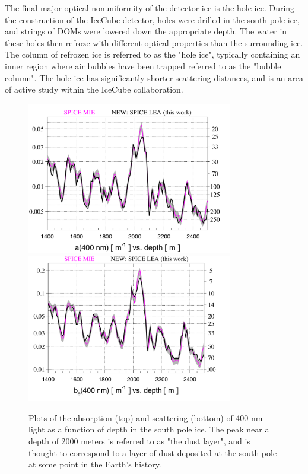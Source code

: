 The final major optical nonuniformity of the detector ice is the hole ice. During the construction of the IceCube detector, holes were drilled in the south pole ice, and strings of DOMs were lowered down the appropriate depth. The water in these holes then refroze with different optical properties than the surrounding ice. The column of refrozen ice is referred to as the "hole ice", typically containing an inner region where air bubbles have been trapped referred to as the "bubble column". The hole ice has significantly shorter scattering distances, and is an area of active study within the IceCube collaboration. 

\begin{figure}[h]
\centering
\includegraphics[width=0.8\textwidth]{figs/icedepth1.png}
\includegraphics[width=0.8\textwidth]{figs/icedepth2.png}
\caption{Plots of the absorption (top) and scattering (bottom) of 400 nm light as a function of depth in the south pole ice. The peak near a depth of 2000 meters is referred to as "the dust layer", and is thought to correspond to a layer of dust deposited at the south pole at some point in the Earth's history.  ~\cite{iceproceedings} }
\label{fig:icedepth}
\end{figure}

